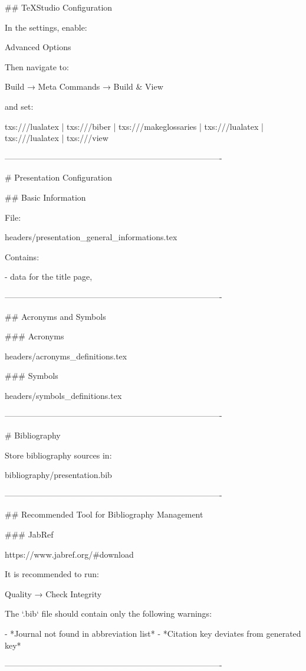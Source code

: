 ## TeXStudio Configuration

In the settings, enable:

Advanced Options

Then navigate to:

Build → Meta Commands → Build & View

and set:

txs:///lualatex |
txs:///biber |
txs:///makeglossaries |
txs:///lualatex |
txs:///lualatex |
txs:///view

-------------------------------------------------------------------------------

# Presentation Configuration

## Basic Information

File:

headers/presentation_general_informations.tex

Contains:

- data for the title page,

-------------------------------------------------------------------------------

## Acronyms and Symbols

### Acronyms

headers/acronyms_definitions.tex

### Symbols

headers/symbols_definitions.tex

-------------------------------------------------------------------------------

# Bibliography

Store bibliography sources in:

bibliography/presentation.bib

-------------------------------------------------------------------------------

## Recommended Tool for Bibliography Management

### JabRef

https://www.jabref.org/#download

It is recommended to run:

Quality → Check Integrity

The `.bib` file should contain only the following warnings:

- *Journal not found in abbreviation list*  
- *Citation key deviates from generated key*

-------------------------------------------------------------------------------

